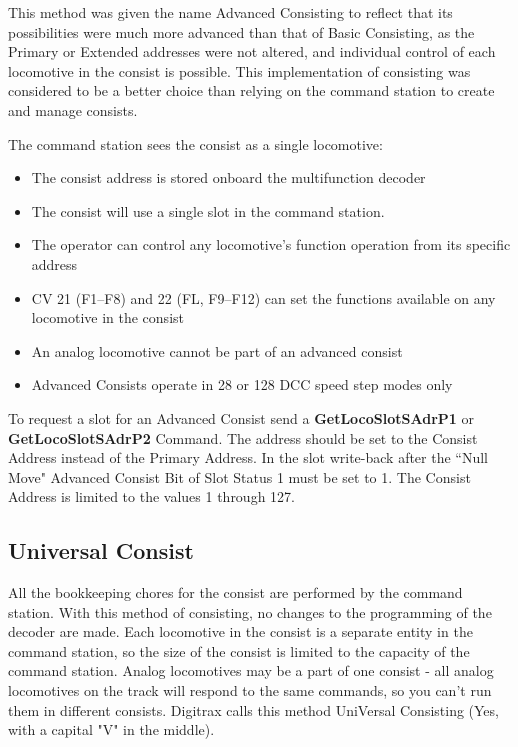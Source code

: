 This method was given the name Advanced Consisting to reflect that its possibilities were much more advanced than that of Basic Consisting, as the Primary or Extended addresses were not altered, and individual control of each locomotive in the consist is possible. This implementation of consisting was considered to be a better choice than relying on the command station to create and manage consists.

The command station sees the consist as a single locomotive:

\begin{itemize}
\item The consist address is stored onboard the multifunction decoder
\item The consist will use a single slot in the command station.  
\item The operator can control any locomotive's function operation from its specific address
\item CV 21 (F1–F8) and 22 (FL, F9–F12) can set the functions available on any locomotive in the consist
\item An analog locomotive cannot be part of an advanced consist
\item Advanced Consists operate in 28 or 128 DCC speed step modes only
\end{itemize}

To request a slot for an \gls{Advanced Consist} send a \textbf{GetLocoSlotSAdrP1} or \textbf{GetLocoSlotSAdrP2} \gls{Command}. The address should be set to the \gls{Consist Address} instead of the \gls{Primary Address}. In the slot write-back after the ``Null Move" \gls{Advanced Consist Bit} of \gls{Slot Status 1} must be set to 1. The \gls{Consist Address} is limited to the values 1 through 127.

\subsection{Universal Consist}

All the bookkeeping chores for the consist are performed by the command station. With this method of consisting, no changes to the programming of the decoder are made. Each locomotive in the consist is a separate entity in the command station, so the size of the consist is limited to the capacity of the command station. Analog locomotives may be a part of one consist - all analog locomotives on the track will respond to the same commands, so you can't run them in different consists. Digitrax calls this method UniVersal Consisting (Yes, with a capital "V" in the middle).

